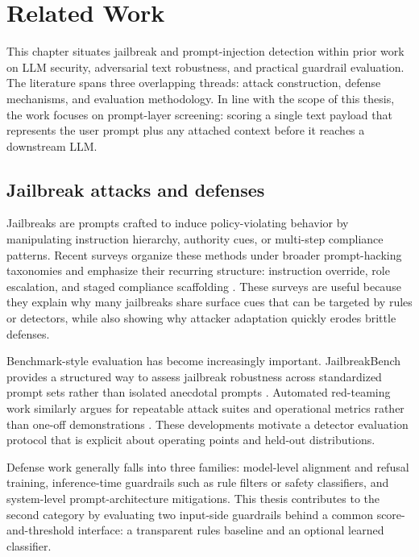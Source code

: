 \chapter{Related Work}
\label{ch:related_work}

This chapter situates jailbreak and prompt-injection detection within prior work on LLM security, adversarial text robustness, and practical guardrail evaluation. The literature spans three overlapping threads: attack construction, defense mechanisms, and evaluation methodology. In line with the scope of this thesis, the work focuses on prompt-layer screening: scoring a single text payload that represents the user prompt plus any attached context before it reaches a downstream LLM.

\section{Jailbreak attacks and defenses}

Jailbreaks are prompts crafted to induce policy-violating behavior by manipulating instruction hierarchy, authority cues, or multi-step compliance patterns. Recent surveys organize these methods under broader prompt-hacking taxonomies and emphasize their recurring structure: instruction override, role escalation, and staged compliance scaffolding \cite{rababah2024sokprompthacking}. These surveys are useful because they explain why many jailbreaks share surface cues that can be targeted by rules or detectors, while also showing why attacker adaptation quickly erodes brittle defenses.

Benchmark-style evaluation has become increasingly important. JailbreakBench provides a structured way to assess jailbreak robustness across standardized prompt sets rather than isolated anecdotal prompts \cite{chao2024jailbreakbench}. Automated red-teaming work similarly argues for repeatable attack suites and operational metrics rather than one-off demonstrations \cite{perez2022redteaming}. These developments motivate a detector evaluation protocol that is explicit about operating points and held-out distributions.

Defense work generally falls into three families: model-level alignment and refusal training, inference-time guardrails such as rule filters or safety classifiers, and system-level prompt-architecture mitigations. This thesis contributes to the second category by evaluating two input-side guardrails behind a common score-and-threshold interface: a transparent rules baseline and an optional learned classifier.


